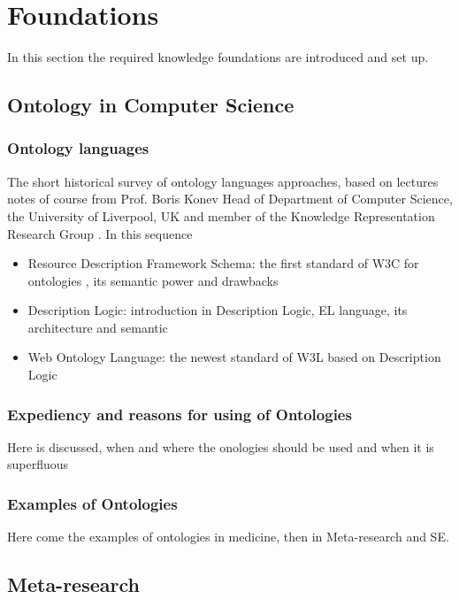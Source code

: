 \section{Foundations}
In this section the required knowledge foundations are introduced and set up.
	\subsection{Ontology in Computer Science}
	
		\subsubsection{Ontology languages}
		The short historical survey of ontology languages approaches, based on lectures notes of course  from Prof. Boris Konev  Head of Department of Computer Science, the University of Liverpool, UK and member of the Knowledge Representation Research Group \cite{Kon10}. 
		In this sequence
			\begin{itemize}
				\item Resource Description Framework Schema: the first standard of W3C for ontologies \cite{rdfs04}, its semantic power and drawbacks
				\item Description Logic: introduction in Description Logic, EL language, its architecture and semantic
				\item Web Ontology Language: the newest standard of W3L based on Description Logic \cite{owl04}
			\end{itemize}
		\subsubsection{Expediency and reasons for using of Ontologies}
		Here is discussed, when and where the onologies should be used and when it is superfluous
		\subsubsection{Examples of Ontologies}
		Here come the examples of ontologies in medicine, then in Meta-research and SE.
		
	\subsection{Meta-research}
